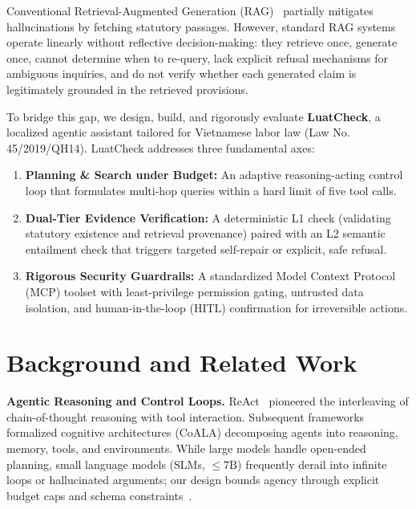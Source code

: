 \documentclass[a4paper,11pt]{article}
\newcommand{\hdr}[1]{\vspace{3pt}\noindent\textbf{#1}}
\begin{document}
Conventional Retrieval-Augmented Generation (RAG)~\citep{lewis2020rag} partially mitigates hallucinations by fetching statutory passages. However, standard RAG systems operate linearly without reflective decision-making: they retrieve once, generate once, cannot determine when to re-query, lack explicit refusal mechanisms for ambiguous inquiries, and do not verify whether each generated claim is legitimately grounded in the retrieved provisions.

To bridge this gap, we design, build, and rigorously evaluate \textbf{LuatCheck}, a localized agentic assistant tailored for Vietnamese labor law (Law No. 45/2019/QH14). LuatCheck addresses three fundamental axes:
\begin{enumerate}[leftmargin=18pt,noitemsep]
    \item \textbf{Planning \& Search under Budget:} An adaptive reasoning-acting control loop that formulates multi-hop queries within a hard limit of five tool calls.
    \item \textbf{Dual-Tier Evidence Verification:} A deterministic L1 check (validating statutory existence and retrieval provenance) paired with an L2 semantic entailment check that triggers targeted self-repair or explicit, safe refusal.
    \item \textbf{Rigorous Security Guardrails:} A standardized Model Context Protocol (MCP) toolset with least-privilege permission gating, untrusted data isolation, and human-in-the-loop (HITL) confirmation for irreversible actions.
\end{enumerate}

\section{Background and Related Work}

\hdr{Agentic Reasoning and Control Loops.} ReAct~\citep{yao2023react} pioneered the interleaving of chain-of-thought reasoning with tool interaction. Subsequent frameworks formalized cognitive architectures (CoALA) decomposing agents into reasoning, memory, tools, and environments. While large models handle open-ended planning, small language models (SLMs, $\le 7\text{B}$) frequently derail into infinite loops or hallucinated arguments; our design bounds agency through explicit budget caps and schema constraints~\citep{anthropic2024agents}.
\end{document}
